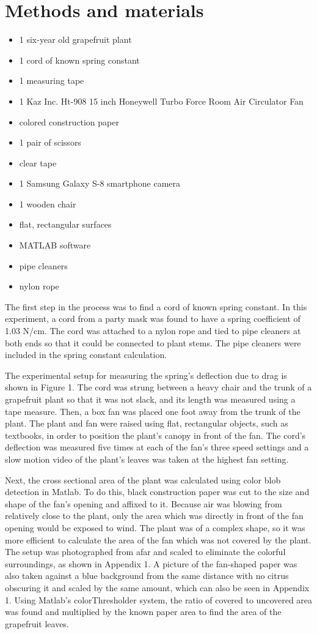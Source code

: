 \section{Methods and materials}
\begin{itemize}
\item 1 six-year old grapefruit plant
\item 1 cord of known spring constant
\item 1 measuring tape
\item 1 Kaz Inc. Ht-908 15 inch Honeywell Turbo Force Room Air Circulator Fan
\item colored construction paper
\item 1 pair of scissors
\item clear tape
\item 1 Samsung Galaxy S-8 smartphone camera
\item 1 wooden chair
\item flat, rectangular surfaces
\item MATLAB software
\item pipe cleaners
\item nylon rope
\end{itemize}

	The first step in the process was to find a cord of known spring constant. In this experiment, a cord from a party mask was found to have a spring coefficient of 1.03 N/cm. The cord was attached to a nylon rope and tied to pipe cleaners at both ends so that it could be connected to plant stems. The pipe cleaners were included in the spring constant calculation.

	The experimental setup for measuring the spring's deflection due to drag is shown in Figure 1. The cord was strung between a heavy chair and the trunk of a grapefruit plant so that it was not slack, and its length was measured using a tape measure. Then, a box fan was placed one foot away from the trunk of the plant. The plant and fan were raised using flat, rectangular objects, such as textbooks, in order to position the plant's canopy in front of the fan. The cord's deflection was measured five times at each of the fan's three speed settings and a slow motion video of the plant's leaves was taken at the highest fan setting.

	Next, the cross sectional area of the plant was calculated using color blob detection in Matlab. To do this, black construction paper was cut to the size and shape of the fan's opening and affixed to it. Because air was blowing from relatively close to the plant, only the area which was directly in front of the fan opening would be exposed to wind. The plant was of a complex shape, so it was more efficient to calculate the area of the fan which was not covered by the plant. The setup was photographed from afar and scaled to eliminate the colorful surroundings, as shown in Appendix 1. A picture of the fan-shaped paper was also taken against a blue background from the same distance with no citrus obscuring it and scaled by the same amount, which can also be seen in Appendix 1. Using Matlab's colorThresholder system, the ratio of covered to uncovered area was found and multiplied by the known paper area to find the area of the grapefruit leaves.

